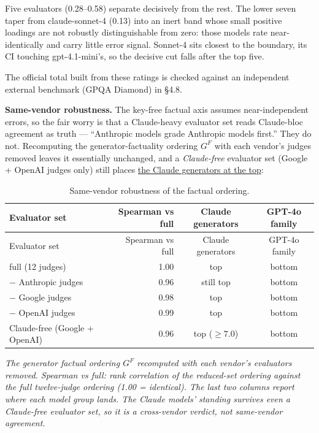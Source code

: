 Five evaluators (0.28--0.58) separate decisively from the rest. The lower seven taper from claude-sonnet-4 (0.13) into an inert band whose small positive loadings are not robustly distinguishable from zero: those models rate near-identically and carry little error signal. Sonnet-4 sits closest to the boundary, its CI touching gpt-4.1-mini's, so the decisive cut falls after the top five.

The official total built from these ratings is checked against an independent external benchmark (GPQA Diamond) in §4.8.

\textbf{Same-vendor robustness.} The key-free factual axis assumes near-independent errors, so the fair worry is that a Claude-heavy evaluator set reads Claude-bloc agreement as truth --- ``Anthropic models grade Anthropic models first.'' They do not. Recomputing the generator-factuality ordering \(G^{F}\) with each vendor's judges removed leaves it essentially unchanged, and a \emph{Claude-free} evaluator set (Google + OpenAI judges only) still places \hyperref[tab-vendor-robustness]{the Claude generators at the top}:

\protect{}\label{tab-vendor-robustness}{}

\begin{longtable}[]{@{}lrcc@{}}
\caption{Same-vendor robustness of the factual ordering.}\tabularnewline
\toprule\noalign{}
Evaluator set & Spearman vs full & Claude generators & GPT-4o family \\
\midrule\noalign{}
\endfirsthead
\toprule\noalign{}
Evaluator set & Spearman vs full & Claude generators & GPT-4o family \\
\midrule\noalign{}
\endhead
\bottomrule\noalign{}
\endlastfoot
full (12 judges) & 1.00 & top & bottom \\
− Anthropic judges & 0.96 & still top & bottom \\
− Google judges & 0.98 & top & bottom \\
− OpenAI judges & 0.99 & top & bottom \\
Claude-free (Google + OpenAI) & 0.96 & top (\(\ge 7.0\)) & bottom \\
\end{longtable}

\emph{The generator factual ordering \(G^{F}\) recomputed with each vendor's evaluators removed. Spearman vs full: rank correlation of the reduced-set ordering against the full twelve-judge ordering (1.00 = identical). The last two columns report where each model group lands. The Claude models' standing survives even a Claude-free evaluator set, so it is a cross-vendor verdict, not same-vendor agreement.}

